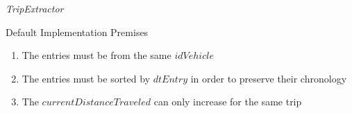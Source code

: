 \documentclass[xcolor=dvipsnames,table]{beamer}
\begin{document}
\begin{frame}{\textit{TripExtractor}}
        \begin{block}{Default Implementation Premises}
                \begin{enumerate}
                        \item The entries must be from the same $idVehicle$
                        \item The entries must be sorted by $dtEntry$ in order to preserve their chronology
                        \item The $currentDistanceTraveled$ can only increase for the same trip
                \end{enumerate}
        \end{block}
\end{frame}
\end{document}
